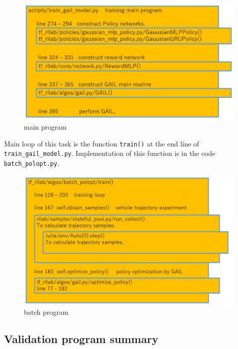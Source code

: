 \begin{figure}[H]
\begin{center}
\includegraphics[width=14cm]{./figures/training_main_program.png}
\caption{main program}
\label{fig:training_main}
\end{center}
\end{figure}

Main loop of this task is the function {\tt train()} at the end line of {\tt train\_gail\_model.py}.
Implementation of this function is in the code {\tt batch\_polopt.py}.


\begin{figure}[H]
\begin{center}
\includegraphics[width=14cm]{./figures/training_batch_program.png}
\caption{batch program}
\label{fig:training_batch}
\end{center}
\end{figure}








\subsection{Validation program summary}

